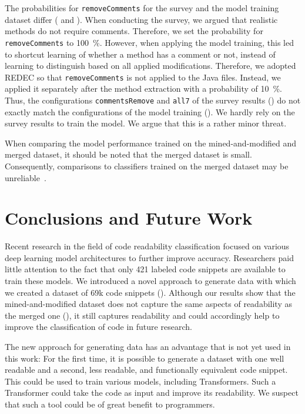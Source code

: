 \documentclass[%
class=scrreprt,
chapterprefix=false,%
open=right,%
twoside=true,%
paper=a4,%
logofile={Logo\_zentral\_farbig\_EN.png},%
thesistype=master,%
UKenglish,%
]{se2thesis}
\theoremstyle{definition}
\newcommand{\numSamples}{69k\xspace}
\newcommand{\rdh}{REDEC\xspace}
\begin{document}
	The probabilities for \texttt{removeComments} for the survey and the model training dataset differ ( and ). When conducting the survey, we argued that realistic methods do not require comments. Therefore, we set the probability for \texttt{removeComments} to 100~\%. However, when applying the model training, this led to shortcut learning of whether a method has a comment or not, instead of learning to distinguish based on all applied modifications. Therefore, we adopted \rdh so that \texttt{removeComments} is not applied to the Java files. Instead, we applied it separately after the method extraction with a probability of 10~\%.
	Thus, the configurations \texttt{commentsRemove} and \texttt{all7} of the survey results () do not exactly match the configurations of the model training ().
	We hardly rely on the survey results to train the model. We argue that this is a rather minor threat.
	
	When comparing the model performance trained on the mined-and-modified and merged dataset, it should be noted that the merged dataset is small. Consequently, comparisons to classifiers trained on the merged dataset may be unreliable~\cite{mi2022towards}.
	
\chapter{Conclusions and Future Work} \label{Conclusions}
	Recent research in the field of code readability classification focused on various deep learning model architectures to further improve accuracy. Researchers paid little attention to the fact that only 421 labeled code snippets are available to train these models. We introduced a novel approach to generate data with which we created a dataset of \numSamples code snippets (). Although our results show that the mined-and-modified dataset does not capture the same aspects of readability as the merged one (), it still captures readability and could accordingly help to improve the classification of code in future research.
	
	The new approach for generating data has an advantage that is not yet used in this work: For the first time, it is possible to generate a dataset with one well readable and a second, less readable, and functionally equivalent code snippet. This could be used to train various models, including Transformers. Such a Transformer could take the code as input and improve its readability. We suspect that such a tool could be of great benefit to programmers.
	
\end{document}
